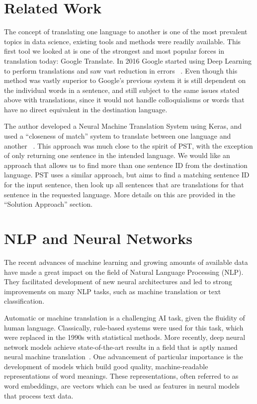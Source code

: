 \documentclass[runningheads]{llncs}
\begin{document}
	\section{Related Work}
	The concept of translating one language to another is one of the most prevalent topics in data science, existing tools and methods were readily available. This first tool we looked at is one of the strongest and most popular forces in translation today: Google Translate. In 2016 Google started using Deep Learning  to perform translations and saw vast reduction in errors ~\cite{ref_url18}. Even though this method was vastly superior to Google's previous system it is still dependent on the individual words in a sentence, and still subject to the same issues stated above with translations, since it would not handle colloquialisms or words that have no direct equivalent in the destination language. 

	The author developed a Neural Machine Translation System using Keras, and used a ``closeness of match'' system to translate between one language and another ~\cite{ref_url16}. This approach was much close to the spirit of PST, with the exception of only returning one sentence in the intended language. We would like an approach that allows us to find more than one sentence ID from the destination language. PST uses a similar approach, but aims to find a matching sentence ID for the input sentence, then look up all sentences that are translations for that sentence in the requested language. More details on this are provided in the ``Solution Approach'' section.
	
	\section{NLP and Neural Networks}
	The recent advances of machine learning and growing amounts of available data have made a great impact on the field of  Natural Language Processing (NLP). They facilitated development of new neural architectures and led to strong improvements on many NLP tasks, such as machine translation or text classification. 
	
	Automatic or machine translation is a challenging AI task, given the fluidity of human language. Classically, rule-based systems were used for this task, which were replaced in the 1990s with statistical methods. More recently, deep neural network models achieve state-of-the-art results in a field that is aptly named neural machine translation~\cite{ref_url16}.
	One advancement of particular importance is the development of models which build good quality, machine-readable representations of word meanings. These representations, often referred to as word embeddings, are vectors which can be used as features in neural models that process text data.
	
\end{document}
